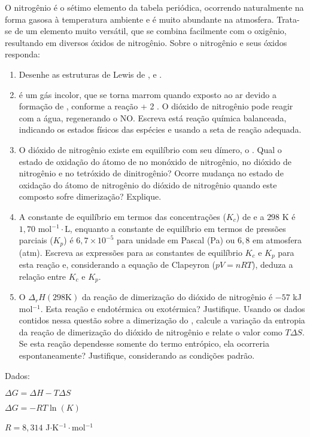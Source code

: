O nitrogênio é o sétimo elemento da tabela periódica, ocorrendo naturalmente
na forma gasosa  à temperatura ambiente e é muito abundante na atmosfera. Trata-se de um elemento muito versátil, que se combina facilmente com o oxigênio, resultando em diversos óxidos de nitrogênio. Sobre o nitrogênio e seus óxidos responda:

\begin{enumerate}[label = (\alph*)]
	\item Desenhe as estruturas de Lewis de ,  e .
	\item {} é um gás incolor, que se torna marrom quando exposto ao ar devido a formação de , conforme a reação  +  \arrow{->} 2 \schemestop.
		O dióxido de nitrogênio pode reagir com a água, regenerando o NO.
		Escreva está reação química balanceada, indicando os estados físicos das espécies e usando a seta de reação adequada.
	\item O dióxido de nitrogênio existe em equilíbrio com seu dímero, o .
		Qual o estado de oxidação do átomo de  no monóxido de nitrogênio, no dióxido de nitrogênio e no tetróxido de dinitrogênio?
		Ocorre mudança no estado de oxidação do átomo de nitrogênio do dióxido de nitrogênio quando este composto sofre dimerização?
		Explique.
	\item A constante de equilíbrio em termos das concentrações ($K_c$) de  e  a $298$ K é $1,70$ mol$^{-1}\cdot$L, enquanto a constante de equilíbrio em termos de pressões parciais ($K_p$) é $6,7 \times 10^{-5}$ para unidade em Pascal (Pa) ou $6,8$ em atmosfera (atm).
		Escreva as expressões para as constantes de equilíbrio $K_c$ e $K_p$ para esta reação e, considerando a equação de Clapeyron ($pV = nRT$), deduza a relação entre $K_c$ e $K_p$.
	\item O $\Delta_{r}H(298 \mathrm{K})$ da reação de dimerização do dióxido de nitrogênio é $-57$ kJ mol$^{-1}$.
		Esta reação e endotérmica ou exotérmica? Justifique.
		Usando os dados contidos nessa questão sobre a dimerização do , calcule a variação da entropia da reação de dimerização do dióxido de nitrogênio e relate o valor como $T\Delta S$.
		Se esta reação dependesse somente do termo entrópico, ela ocorreria espontaneamente?
		Justifique, considerando as condições padrão.
\end{enumerate}

Dados:
\begin{enumerate*}[label = , itemjoin={\qquad}]
	\item 	$\Delta G = \Delta H - T\Delta S$
	\item	$\Delta G=-RT\ln(K)$
	\item	$R=8,314$ J$\cdot$K$^{-1}\cdot$mol$^{-1}$
\end{enumerate*}

